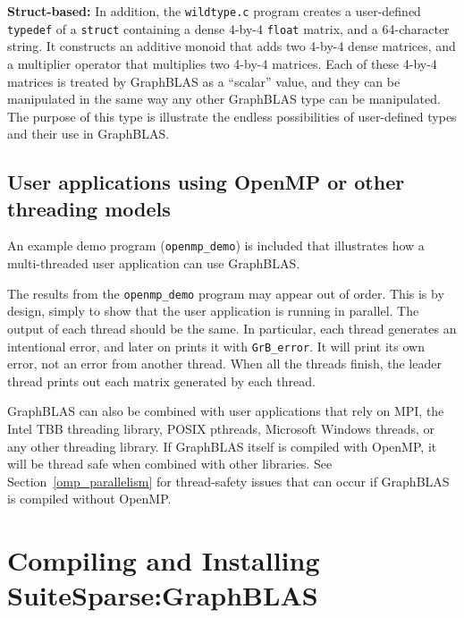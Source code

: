 \documentclass[12pt]{article}
\begin{document}
{\bf Struct-based:}
In addition, the \verb'wildtype.c' program  creates a user-defined
\verb'typedef' of a \verb'struct' containing a dense 4-by-4 \verb'float'
matrix, and a 64-character string.  It constructs an additive monoid that adds
two 4-by-4 dense matrices, and a multiplier operator that multiplies two 4-by-4
matrices.  Each of these 4-by-4 matrices is treated by GraphBLAS as a
``scalar'' value, and they can be manipulated in the same way any other
GraphBLAS type can be manipulated. The purpose of this type is illustrate the
endless possibilities of user-defined types and their use in GraphBLAS.

\subsection{User applications using OpenMP or other threading models}
\label{threads}

An example demo program (\verb'openmp_demo') is included that illustrates how a
multi-threaded user application can use GraphBLAS.

The results from the \verb'openmp_demo' program may appear out of order.  This
is by design, simply to show that the user application is running in parallel.
The output of each thread should be the same.  In particular, each thread
generates an intentional error, and later on prints it with \verb'GrB_error'.
It will print its own error, not an error from another thread.  When all the
threads finish, the leader thread prints out each matrix generated by each
thread.

GraphBLAS can also be combined with user applications that rely on MPI, the
Intel TBB threading library, POSIX pthreads, Microsoft Windows threads, or any
other threading library.  If GraphBLAS itself is compiled with OpenMP,
it will be thread safe when combined with other libraries.
See Section~\ref{omp_parallelism} for thread-safety issues that can occur
if GraphBLAS is compiled without OpenMP.

\newpage
\section{Compiling and Installing SuiteSparse:GraphBLAS}
\label{sec:install}
\end{document}
